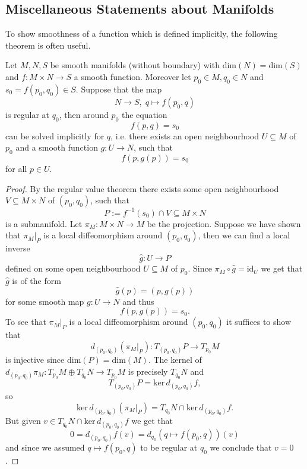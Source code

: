 \subsection{Miscellaneous Statements about Manifolds}

To show smoothness of a function which is defined implicitly, the following theorem is often useful.
\begin{theorem}
    Let $M,N,S$ be smooth manifolds (without boundary) with $\mathrm{dim}(N) = \mathrm{dim}(S)$ and $f \colon M \times N \to S$ a smooth function. Moreover let $p_0 \in M, q_0 \in N$ and $s_0 = f(p_0,q_0) \in S$. Suppose that the map
    \[
    N \to S, \; q \mapsto f(p_0,q)
    \]
    is regular at $q_0$, then around $p_0$ the equation 
    \[
    f(p,q) = s_0
    \]
    can be solved implicitly for $q$, i.e. there exists an open neighbourhood $U \subseteq M$ of $p_0$ and a smooth function $g\colon U \to N$, such that 
    \[
    f(p,g(p)) = s_0
    \]
    for all $p\in U$.
\end{theorem}

\begin{proof}
    By the regular value theorem there exists some open neighbourhood $V \subseteq M \times N$ of $(p_0,q_0)$, such that 
    \[
    P:= f^{-1}(s_0) \cap V \subseteq M \times N
    \]
    is a submanifold. Let $\pi_M \colon M \times N \to M$ be the projection. Suppose we have shown that $\pi_M|_P$ is a local diffeomorphism around $(p_0,q_0)$, then we can find a local inverse 
    \[
    \hat{g} \colon U \to P
    \]
    defined on some open neighbourhood $U \subseteq M$ of $p_0$. Since $\pi_M \circ \hat{g} = \mathrm{id}_U$ we get that $\hat{g}$ is of the form 
    \[
    \hat{g}(p) = (p,g(p))
    \]
    for some smooth map $g \colon U \to N$ and thus 
    \[
    f(p,g(p)) = s_0.
    \]
    To see that $\pi_M|_P$ is a local diffeomorphism around $(p_0,q_0)$ it suffices to show that 
    \[
    d_{(p_0,q_0)}(\pi_M|_P) \colon T_{(p_0,q_0)}P \to T_{p_0}M
    \]
    is injective since $\mathrm{dim}(P) = \mathrm{dim}(M)$. The kernel of $d_{(p_0,q_0)}\pi_M \colon T_{p_0}M \oplus T_{q_0}N \to T_{p_0}M$ is precisely $T_{q_0}N$ and 
    \[
    T_{(p_0,q_0)}P = \mathrm{ker}\,d_{(p_0,q_0)}f,
    \]
    so
    \[
    \mathrm{ker}\,d_{(p_0,q_0)}(\pi_M|_P) = T_{q_0}N \cap \mathrm{ker}\,d_{(p_0,q_0)}f.
    \]
    But given $v \in T_{q_0}N \cap \mathrm{ker}\,d_{(p_0,q_0)}f$ we get that 
    \[
    0 = d_{(p_0,q_0)}f(v) = d_{q_0}(q \mapsto f(p_0,q))(v)
    \]
    and since we assumed $q \mapsto f(p_0,q)$ to be regular at $q_0$ we conclude that $v=0$.
\end{proof}